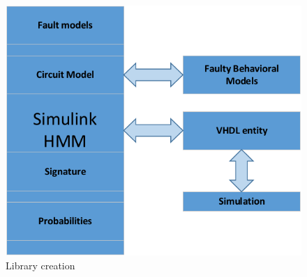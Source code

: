 \begin{figure}[tb!]

 \centering
  \captionsetup{justification=centering}    
   \includegraphics[scale=0.8]{Figures/simulink.pdf}
   \caption{Library creation}
\label{fig:lib}
\end{figure}






%
%
%




